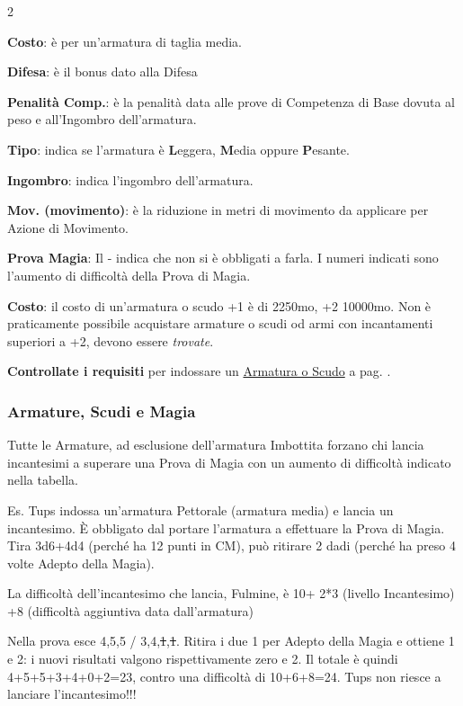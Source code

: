 \begin{multicols}{2}

\medskip

\textbf{Costo}: è per un'armatura di taglia media.

\textbf{Difesa}: è il bonus dato alla Difesa

\textbf{Penalità Comp.}: è la penalità data alle prove di Competenza di Base dovuta al peso e all'Ingombro dell'armatura.

\textbf{Tipo}: indica se l'armatura è \textbf{L}eggera, \textbf{M}edia oppure \textbf{P}esante.

\textbf{Ingombro}: indica l'ingombro dell'armatura.

\textbf{Mov. (movimento)}: è la riduzione in metri di movimento da applicare per Azione di Movimento.

\textbf{Prova Magia}: Il - indica che non si è obbligati a farla. I numeri indicati sono l'aumento di difficoltà della Prova di Magia.

\textbf{Costo}: il costo di un'armatura o scudo +1 è di 2250mo, +2 10000mo. Non è praticamente possibile acquistare armature o scudi od armi con incantamenti superiori a +2, devono essere \emph{trovate}.

\textbf{Controllate i requisiti} per indossare un \hyperlink{indossarearmature}{Armatura o Scudo} a pag. \pageref{indossarearmature}.


\subsubsection{Armature, Scudi e Magia}\hypertarget{armatureemagie}{}\label{armatureemagie}

Tutte le Armature, ad esclusione dell'armatura Imbottita forzano chi lancia incantesimi a superare una Prova di Magia con un aumento di difficoltà indicato nella tabella.

Es. Tups indossa un'armatura Pettorale (armatura media) e lancia un incantesimo. È obbligato dal portare l'armatura a effettuare la Prova di Magia. Tira 3d6+4d4 (perché ha 12 punti in CM), può ritirare 2 dadi (perché ha preso 4 volte Adepto della Magia).

La difficoltà dell'incantesimo che lancia, Fulmine, è 10+ 2*3 (livello Incantesimo) +8 (difficoltà aggiuntiva data dall'armatura)

Nella prova esce 4,5,5 / 3,4,\st{1},\st{1}. Ritira i due 1 per Adepto della Magia e ottiene 1 e 2: i nuovi risultati valgono rispettivamente zero e 2. Il totale è quindi 4+5+5+3+4+0+2=23, contro una difficoltà di 10+6+8=24. Tups non riesce a lanciare l'incantesimo!!!


\end{multicols}
